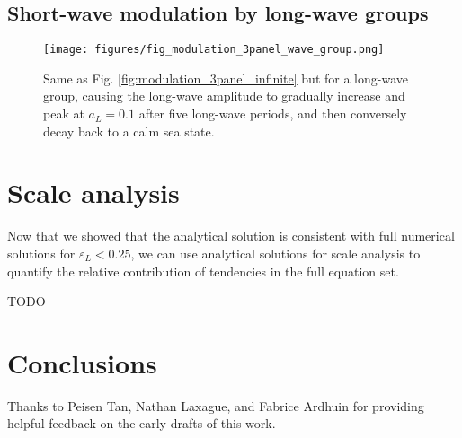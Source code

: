 \documentclass[draft]{agujournal2019}
\begin{document}
\subsection{Short-wave modulation by long-wave groups}
\label{subsection:wave_groups}

\begin{figure}[h]
\label{fig:modulation_3panel_groups}
\centering
\texttt{[image: figures/fig\_modulation\_3panel\_wave\_group.png]}
\caption{
  Same as Fig. \ref{fig:modulation_3panel_infinite} but for a long-wave group,
  causing the long-wave amplitude to gradually increase and peak at $a_L = 0.1$
  after five long-wave periods, and then conversely decay back to a calm sea state.
}
\end{figure}



\section{Scale analysis}
\label{section:scale_analysis}

Now that we showed that the analytical solution is consistent with full numerical
solutions for $\varepsilon_L < 0.25$, we can use analytical solutions for scale
analysis to quantify the relative contribution of tendencies in the full equation set.

TODO

\section{Conclusions}

\acknowledgments
Thanks to Peisen Tan, Nathan Laxague, and Fabrice Ardhuin for providing helpful
feedback on the early drafts of this work.


\end{document}
